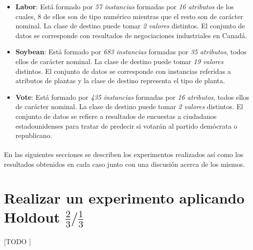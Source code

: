 \documentclass{article}
\begin{document}
			\begin{itemize}

				\item \textbf{Labor}\cite{dataset:labor}: Está formado por \emph{57 instancias} formadas por \emph{16 atributos} de los cuales, 8 de ellos son de tipo numérico mientras que el resto son de carácter nominal. La clase de destino puede tomar \emph{2 valores} distintos. El conjunto de datos se corresponde con resultados de negociaciones industriales en Canadá.

				\item \textbf{Soybean}\cite{dataset:soybean}: Está formado por \emph{683 instancias} formadas por \emph{35 atributos}, todos ellos de carácter nominal. La clase de destino puede tomar \emph{19 valores} distintos. El conjunto de datos se corresponde con instancias referidas a atributos de plantas y la clase de destino representa el tipo de planta.

				\item \textbf{Vote}\cite{dataset:vote}: Está formado por \emph{435 instancias} formadas por \emph{16 atributos}, todos ellos de carácter nominal. La clase de destino puede tomar \emph{2 valores} distintos. El conjunto de datos se refiere a resultados de encuestas a ciudadanos estadounidenses para tratar de predecir si votarán al partido demócrata o republicano.

			\end{itemize}

		\paragraph{}
		En las siguientes secciones se describen los experimentos realizados así como los resultados obtenidos en cada caso junto con una discusión acerca de los mismos.

	\section{Realizar un experimento aplicando Holdout $\tfrac{2}{3}/\tfrac{1}{3}$}
	\label{sec:e1}

		\paragraph{}
		[TODO ]
\end{document}
